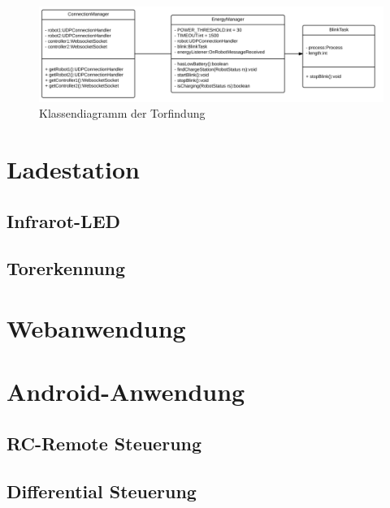 \begin{figure}[h]
	\includegraphics[width=\textwidth]{images/uml_energymanager.pdf}
	\caption{Klassendiagramm der Torfindung}
	\label{fig:uml_energymanager}
\end{figure}


\section{Ladestation}
\subsection{Infrarot-LED}
\label{sec:infrarot_led}
\subsection{Torerkennung}

\section{Webanwendung}

\section{Android-Anwendung}
\subsection{RC-Remote Steuerung}
\subsection{Differential Steuerung}


